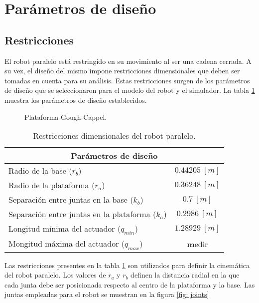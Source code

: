 \section{Parámetros de diseño}

\subsection{Restricciones}
El robot paralelo está restringido en su movimiento 
al ser una cadena cerrada.
A su vez, el diseño del mismo impone restricciones dimensionales 
que deben ser tomadas en cuenta para su análisis.
Estas restricciones surgen de los parámetros de diseño que 
se seleccionaron para el modelo del robot y el simulador.
La tabla \ref{tab: restricciones} muestra los 
parámetros de diseño establecidos.

\begin{figure}
 \centering
 \caption{Plataforma Gough-Cappel.}
 \label{fig: cad}
\end{figure}


\begin{table}[h]
\centering
\begin{tabular}{lc}

\multicolumn{2}{c}{Parámetros de diseño} \\ \hline
Radio de la base ($r_b$) & $0.44205 \ [m]$ \\ 
Radio de la plataforma ($r_a$) & $0.36248 \ [m]$ \\ 
Separación entre juntas en la base ($k_b$) & $0.7 \ [m]$ \\ 
Separación entre juntas en la plataforma ($k_a$) & $0.2986 \ [m]$ \\ 
Longitud mínima del actuador ($q_{min}$) & $1.28929 \ [m]$ \\ 
Mongitud máxima del actuador ($q_{max}$) & \textbf medir \\ 
\end{tabular}
\caption{Restricciones dimensionales del robot paralelo.}
\label{tab: restricciones}
\end{table}

Las restricciones presentes en la tabla \ref{tab: restricciones}
son utilizados para definir la cinemática del robot paralelo.
Los valores de $r_a$ y $r_b$ definen la 
distancia radial en la que cada junta debe ser 
posicionada respecto al centro de la plataforma y la base.
Las juntas empleadas para el robot se muestran 
en la figura \ref{fig: joints}

